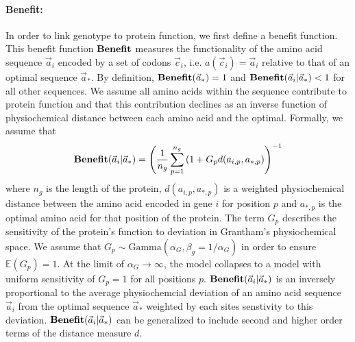 \documentclass{article}
\newcommand{\EE}{\mathbb{E}} %
\newcommand{\Funcaoptvec}{\ensuremath{\Func(\aoptvec)}\xspace}
\newcommand{\Funcaveci}{\ensuremath{\Func(\aveci|\aoptvec)}\xspace}
\newcommand{\Func}{\ensuremath{\text{\textbf{Benefit}}}\xspace}
\newcommand{\aip}{\ensuremath{a_{i,p}}\xspace}
\newcommand{\alphag}{\ensuremath{\alpha_G}\xspace}
\newcommand{\aoptp}{\ensuremath{a_{*,p}}\xspace}
\newcommand{\aoptvec}{\ensuremath{\Vec{a}_*}\xspace}
\newcommand{\aveci}{\ensuremath{\Vec{a}_i}\xspace}
\newcommand{\cveci}{\ensuremath{\cvec_i}\xspace}
\newcommand{\cvec}{\ensuremath{\Vec{c}}\xspace}
\renewcommand{\ng}{\ensuremath{{n_g}}\xspace}
\newcommand{\gp}{\ensuremath{{G_p}}\xspace}
\begin{document}
\paragraph*{Benefit: }
In order to link genotype to protein function, we first define a benefit function.
This benefit function \Func measures the functionality of the amino acid sequence \aveci encoded by a set of codons \cveci, i.e. $a(\cveci) = \aveci$ relative to that of an optimal sequence $\aoptvec$.
By definition,  $\Funcaoptvec = 1$ and $\Funcaveci < 1$ for all other sequences.
We assume all amino acids within the sequence contribute to protein function and that this contribution declines as an inverse function of physiochemical distance between each amino acid and the optimal.
Formally, we assume that 
\begin{equation}
\Funcaveci = \left(\frac{1}{\ng} \sum_{p=1}^\ng \left(1 + \gp d(\aip, \aoptp\right)\right)^{-1}
\end{equation}
where $\ng$ is the length of the protein, $d(\aip, \aoptp)$ is a weighted physiochemical distance between the amino acid encoded in gene $i$ for position $p$ and $\aoptp$ is the optimal amino acid for that position of the protein.
The term \gp describes the sensitivity of the protein's function to deviation in Grantham's physiochemical space.
We assume that  $\gp \sim \text{Gamma}\left(\alphag, \beta_g = 1/\alphag\right)$ in order to ensure $\EE(\gp) = 1$.
At the limit of $\alphag \rightarrow \infty$, the model collapses to a model with uniform sensitivity of $\gp = 1$ for all positions $p$.
\Funcaveci is an inversely proportional to the average physiochemcial deviation of an amino acid sequence \aveci from the optimal sequence \aoptvec weighted by each sites senstivity to this deviation.
\Funcaveci can be generalized to include second and higher order terms of the distance measure $d$.
\end{document}

